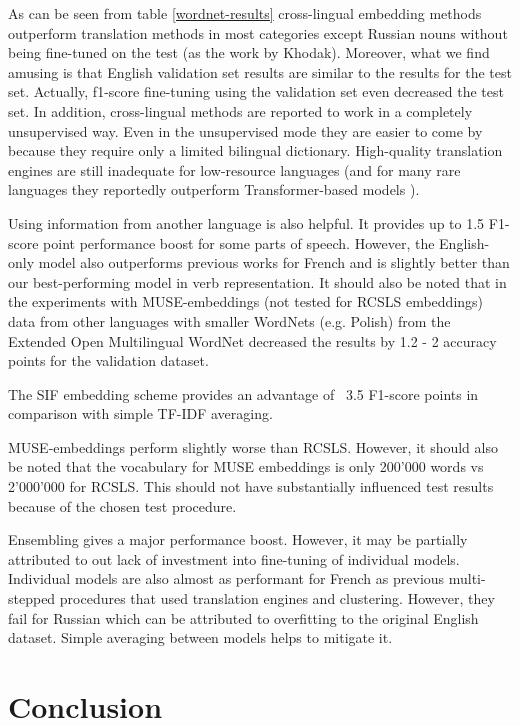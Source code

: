 \documentclass[11pt,a4paper]{article}
\begin{document}
As can be seen from table \ref{wordnet-results} cross-lingual embedding methods outperform translation methods in most categories except Russian nouns without being fine-tuned on the test (as the work by Khodak). Moreover, what we find amusing is that English validation set results are similar to the results for the test set. Actually, f1-score fine-tuning using the validation set even decreased the test set. In addition, cross-lingual methods are reported to work in a completely unsupervised way. Even in the unsupervised mode they are easier to come by because they require only a limited bilingual dictionary. High-quality translation engines are still inadequate for low-resource languages (and for many rare languages they reportedly outperform Transformer-based models \cite{laser}).

Using information from another language is also helpful. It provides up to 1.5 F1-score point performance boost for some parts of speech. However, the English-only model also outperforms previous works for French and is slightly better than our best-performing model in verb representation. It should also be noted that in the experiments with MUSE-embeddings (not tested for RCSLS embeddings) data from other languages with smaller WordNets (e.g. Polish) from the Extended Open Multilingual WordNet decreased the results by 1.2 - 2 accuracy points for the validation dataset.

The SIF embedding scheme provides an advantage of ~3.5 F1-score points in comparison with simple TF-IDF averaging.

MUSE-embeddings perform slightly worse than RCSLS. However, it should also be noted that the vocabulary for MUSE embeddings is only 200'000 words vs ~ 2'000'000 for RCSLS. This should not have substantially influenced test results because of the chosen test procedure.

Ensembling gives a major performance boost. However, it may be partially attributed to out lack of investment into fine-tuning of individual models. Individual models are also almost as performant for French as previous multi-stepped procedures that used translation engines and clustering. However, they fail for Russian which can be attributed to overfitting to the original English dataset. Simple averaging between models helps to mitigate it.

\section{Conclusion}
\end{document}
